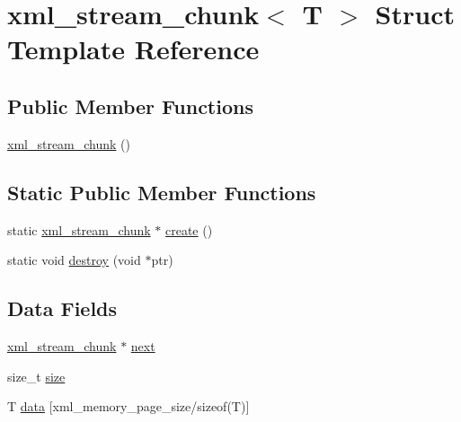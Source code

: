 \hypertarget{structxml__stream__chunk}{\section{xml\-\_\-stream\-\_\-chunk$<$ T $>$ Struct Template Reference}
\label{structxml__stream__chunk}
}
\subsection*{Public Member Functions}
\begin{DoxyCompactItemize}
\item 
\hyperlink{structxml__stream__chunk_a8b87fcb2074014dd252f752a95092337}{xml\-\_\-stream\-\_\-chunk} ()
\end{DoxyCompactItemize}
\subsection*{Static Public Member Functions}
\begin{DoxyCompactItemize}
\item 
static \hyperlink{structxml__stream__chunk}{xml\-\_\-stream\-\_\-chunk} $\ast$ \hyperlink{structxml__stream__chunk_a92cffe33c529ff266329fd4afb59226d}{create} ()
\item 
static void \hyperlink{structxml__stream__chunk_a4b812901d59950d48d539e5c8726a0e8}{destroy} (void $\ast$ptr)
\end{DoxyCompactItemize}
\subsection*{Data Fields}
\begin{DoxyCompactItemize}
\item 
\hyperlink{structxml__stream__chunk}{xml\-\_\-stream\-\_\-chunk} $\ast$ \hyperlink{structxml__stream__chunk_ad00071f7340adb2bde7c4157d4100b3c}{next}
\item 
size\-\_\-t \hyperlink{structxml__stream__chunk_a42618ba3b7bda1246cfc640149fc34eb}{size}
\item 
T \hyperlink{structxml__stream__chunk_a365e2e228a0277467b25a0fea42b8518}{data} \mbox{[}xml\-\_\-memory\-\_\-page\-\_\-size/sizeof(T)\mbox{]}
\end{DoxyCompactItemize}


